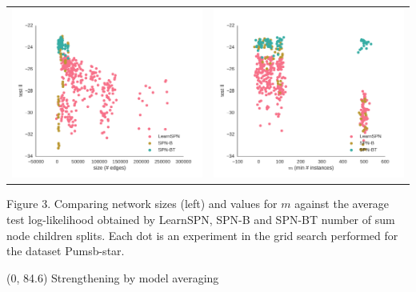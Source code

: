 \documentclass[final]{beamer}
\begin{document}
\begin{frame}{}
\begin{textblock}{25.2}
    \begin{table}[ht]
      \setlength{\tabcolsep}{30pt}  
      \centering
      \begin{tabular}{c c}
        \includegraphics[width=0.4\linewidth]{figures/ll-depth/pumsb-star-ll-depth}&\includegraphics[width=0.4\linewidth]{figures/ll-m/pumsb-star-ll-m}
      \end{tabular}
    \end{table}
    \vspace{-20pt}
    \begin{center}
      \begin{minipage}[t]{0.9\linewidth}
        \tiny\flushleft
        Figure 3. Comparing network sizes (left) and values for $m$
        against the  average test
        log-likelihood obtained by \textsf{LearnSPN}, \textsf{SPN-B} and
        \textsf{SPN-BT}
        number of sum node children splits. Each dot is an experiment
        in the grid search performed for the dataset Pumsb-star.
      \end{minipage}
    \end{center}

  \end{textblock}
  
  
  
  
  \begin{textblock}{80}(0, 84.6)
    Strengthening by model averaging
  \end{textblock}
  

\end{frame}
\end{document}
